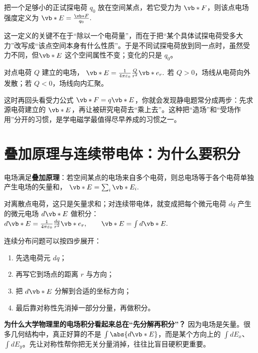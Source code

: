 \documentclass[lang=cn,11pt]{elegantbook}
\begin{document}
\begin{definition}[电场强度]
把一个足够小的正试探电荷 \(q_0\) 放在空间某点，若它受力为 \(\vb*{F}\)，则该点电场强度定义为
 \(\vb*{E}=\frac{\vb*{F}}{q_0}.\) 
\end{definition}

这一定义的关键不在于“除以一个电荷量”，而在于把“某个具体试探电荷受多大力”改写成“该点空间本身有什么性质”。于是不同试探电荷放到同一点时，虽然受力不同，但\(\vb*{E}\) 这个空间属性不变；变化的只是 \(q_0\)。

对点电荷 \(Q\) 建立的电场，
 \(\vb*{E} =\frac{1}{4\pi\varepsilon_0}\frac{Q}{r^2}\vb*{e}_r.\) 
若 \(Q>0\)，场线从电荷向外发散；若 \(Q<0\)，场线向内汇聚。

\begin{remark}
这时再回头看受力公式 \(\vb*{F}=q\vb*{E}\)，你就会发现静电题常分成两步：先求源电荷建立的 \(\vb*{E}\)，再让被研究电荷去“乘上去”。这种把“造场”和“受场作用”分开的习惯，是学电磁学最值得尽早养成的习惯之一。
\end{remark}

\section{叠加原理与连续带电体：为什么要积分}

电场满足\textbf{叠加原理}：若空间某点的电场来自多个电荷，则总电场等于各个电荷单独产生电场的矢量和，
 \(\vb*{E}=\sum_i \vb*{E}_i.\) 

对离散点电荷，这只是矢量求和；对连续带电体，就变成把每个微元电荷 \(dq\) 产生的微元电场 \(d\vb*{E}\) 做积分：
 \(d\vb*{E} =\frac{1}{4\pi\varepsilon_0}\frac{dq}{r^2}\vb*{e}_r, \qquad \vb*{E}=\int d\vb*{E}.\) 

连续分布问题可以按四步展开：
\begin{enumerate}
 \item 先选电荷元 \(dq\)；
 \item 再写它到场点的距离 \(r\) 与方向；
 \item 把 \(d\vb*{E}\) 分解到合适的坐标方向；
 \item 最后靠对称性先消掉一部分分量，再做积分。
\end{enumerate}

\begin{note}
\textbf{为什么大学物理里的电场积分看起来总在“先分解再积分”？} 因为电场是矢量。很多几何结构中，真正好算的不是 \(\int \abs{d\vb*{E}}\)，而是某个方向上的 \(\int dE_x\)、\(\int dE_y\)。先让对称性帮你把无关分量消掉，往往比盲目硬积更重要。
\end{note}
\end{document}
